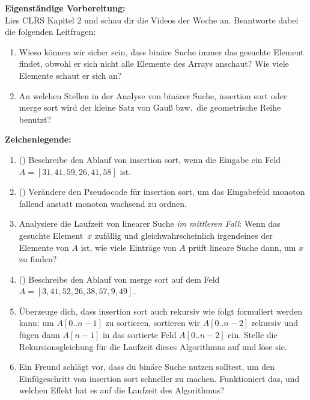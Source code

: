 \documentclass{uebung_cs}
\begin{document}
\textbf{Eigenständige Vorbereitung:}\\
Lies  CLRS Kapitel 2 und schau dir die  Videos der Woche an.
Beantworte dabei die folgenden Leitfragen:
\begin{enumerate}
	\item Wieso können wir sicher sein, dass binäre Suche immer das gesuchte Element findet, obwohl er sich nicht alle Elemente des Arrays anschaut? Wie viele Elemente schaut er sich an?
	\item An welchen Stellen in der Analyse von binärer Suche, insertion sort oder merge sort wird der kleine Satz von Gauß bzw.~die geometrische Reihe benutzt?
\end{enumerate}

\textbf{Zeichenlegende:}
\legende{}



\begin{aufgabe}\label{tue-first}\mbox{}
	\begin{enumerate}
		\item (\warmup) Beschreibe den Ablauf von insertion sort, wenn die Eingabe ein Feld $A=[31,41,59,26,41,58]$ ist.
		\item (\warmup) Verändere den Pseudocode für insertion sort, um das Eingabefeld monoton fallend anstatt monoton wachsend zu ordnen.	
		\item Analysiere die Laufzeit von linearer Suche \emph{im mittleren Fall}: Wenn das gesuchte Element~$x$ zufällig und gleichwahrscheinlich irgendeines der Elemente von $A$ ist, wie viele Einträge von $A$ prüft lineare Suche dann, um $x$ zu finden?
		\item (\warmup) Beschreibe den Ablauf von merge sort auf dem Feld $A=[3,41,52,26,38,57,9,49]$.
		\item Überzeuge dich, dass insertion sort auch rekursiv wie folgt formuliert werden kann: um $A[0..n-1]$ zu sortieren, sortieren wir $A[0..n-2]$ rekursiv und fügen dann $A[n-1]$ in das sortierte Feld $A[0..n-2]$ ein. Stelle die Rekursionsgleichung für die Laufzeit dieses Algorithmus auf und löse sie.
		\item Ein Freund schlägt vor, dass du binäre Suche nutzen solltest, um den Einfügeschritt von insertion sort schneller zu machen. Funktioniert das, und welchen Effekt hat es auf die Laufzeit des Algorithmus?
	\end{enumerate}
\end{aufgabe}
\end{document}

